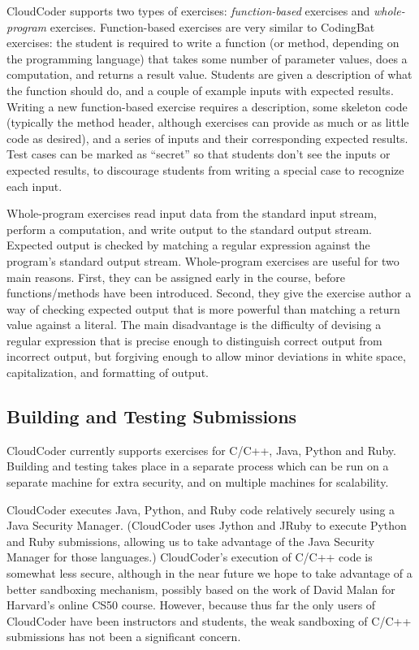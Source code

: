 \documentclass{sig-alternate}
\begin{document}
CloudCoder supports two types of exercises:  {\em function-based}
exercises and {\em whole-program} exercises.  Function-based exercises are
very similar to CodingBat exercises: the student is required to write
a function (or method, depending on the programming language) that takes some number of parameter values,
does a computation, and returns a result value.
Students are given a description of
what the function should do, and a couple of example inputs with
expected results.  Writing a new function-based exercise
requires a description, some skeleton code (typically the method
header, although exercises can provide as much or as little code as
desired), and a series of inputs and their corresponding expected results.
Test cases can be marked as ``secret'' so that students don't see the
inputs or expected results, to discourage students from writing a special case to
recognize each input.

Whole-program exercises read input data from
the standard input stream, perform a computation, and write output to the standard output stream.
Expected output is checked by matching a regular expression against the
program's standard output stream.
Whole-program exercises are useful for two main reasons.  First,
they can be assigned early in the course, before functions/methods
have been introduced.  Second, they give the exercise author a
way of checking expected output that is more powerful than matching a return
value against a literal.  The main disadvantage is
the difficulty of devising a
regular expression that is precise enough to distinguish correct output
from incorrect output, but forgiving enough to allow minor deviations
in white space, capitalization, and formatting of output.

\subsection{Building and Testing Submissions}

CloudCoder currently supports exercises for C/C++, Java, Python and
Ruby.  Building and testing takes place in a separate process which
can be run on a separate machine for extra security, and on multiple
machines for scalability.

CloudCoder executes Java, Python, and Ruby code relatively securely using
a Java Security Manager.
(CloudCoder uses Jython\cite{jython} and JRuby\cite{jruby}
to execute Python and Ruby submissions, allowing us to take advantage of
the Java Security Manager for those languages.)
CloudCoder's execution of C/C++ code is somewhat less secure, although 
in the near future
we hope to take advantage of a better sandboxing mechanism,
possibly based on the work of
David Malan for Harvard's online CS50 course\cite{Malan:2013:CSS:2445196.2445242}.
However, because thus far the only users of
CloudCoder have been instructors and students,
the weak sandboxing of C/C++ submissions has not been a significant concern.
\end{document}
